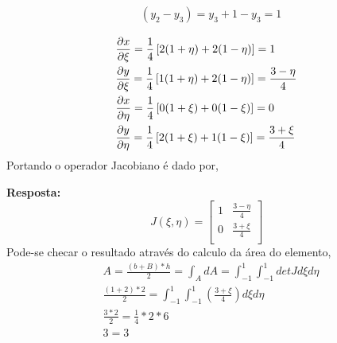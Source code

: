 \begin{itemize}
\begin{equation}
\begin{split}
			&	(y_2 - y_3) = y_3 + 1 - y_3 = 1\\
		\end{split}
	\end{equation}
	\begin{equation}
		\begin{split}
			&	\frac{\partial x}{\partial \xi } = \frac{1}{4}\left[ 2(1 + \eta) + 2(1 - \eta) \right] = 1\\
			&   \frac{\partial y}{\partial \xi } = \frac{1}{4}\left[ 1(1 + \eta) + 2(1 - \eta) \right] = \frac{3 - \eta}{4}\\
			&   \frac{\partial x}{\partial \eta} = \frac{1}{4}\left[ 0(1 + \xi ) + 0(1 - \xi ) \right] = 0\\
			&   \frac{\partial y}{\partial \eta} = \frac{1}{4}\left[ 2(1 + \xi ) + 1(1 - \xi ) \right] = \frac{3 + \xi}{4}
		\end{split}
	\end{equation}
	Portando o operador Jacobiano é dado por,
	
	\color{blue}
	\textbf{Resposta:}
	\begin{equation}
		J(\xi, \eta) = 
		\begin{bmatrix}
			1 & \frac{3 - \eta}{4}\\
			0 & \frac{3 + \xi}{4}\\
		\end{bmatrix}
	\end{equation}	
	\color{black}
	Pode-se checar o resultado através do calculo da área do elemento,
	\begin{equation}
		\begin{split}
			& A = \frac{(b + B) * h}{2} = \int_A dA = \int_{-1}^1 \int_{-1}^1 det J d\xi d\eta\\
			& \frac{(1 + 2) * 2}{2} = \int_{-1}^1 \int_{-1}^1 \left(\frac{3 + \xi}{4}\right)  d\xi d\eta\\
			& \frac{3 * 2}{2} = \frac{1}{4} * 2 * 6 \\
			& 3 = 3		
		\end{split}
	\end{equation}		
%
\end{itemize}
%
